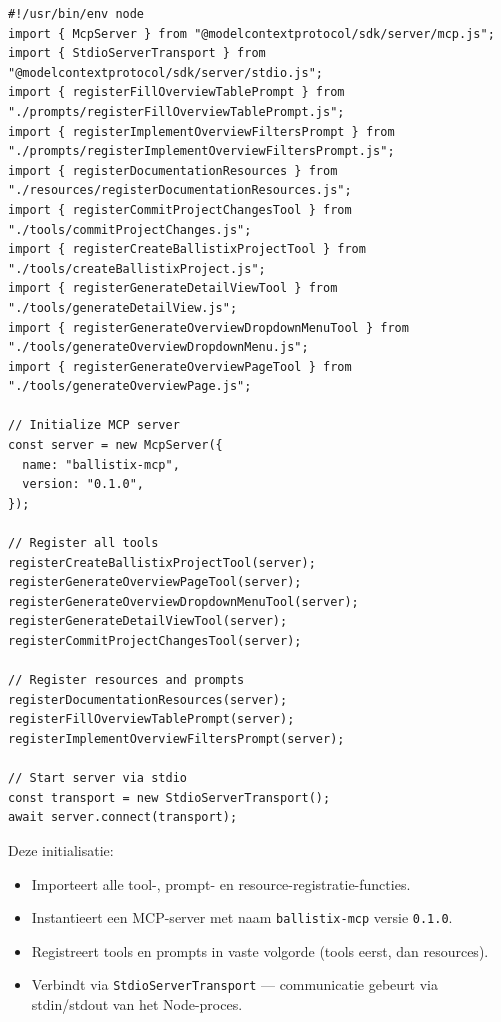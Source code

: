 \begin{verbatim}
#!/usr/bin/env node
import { McpServer } from "@modelcontextprotocol/sdk/server/mcp.js";
import { StdioServerTransport } from "@modelcontextprotocol/sdk/server/stdio.js";
import { registerFillOverviewTablePrompt } from "./prompts/registerFillOverviewTablePrompt.js";
import { registerImplementOverviewFiltersPrompt } from "./prompts/registerImplementOverviewFiltersPrompt.js";
import { registerDocumentationResources } from "./resources/registerDocumentationResources.js";
import { registerCommitProjectChangesTool } from "./tools/commitProjectChanges.js";
import { registerCreateBallistixProjectTool } from "./tools/createBallistixProject.js";
import { registerGenerateDetailViewTool } from "./tools/generateDetailView.js";
import { registerGenerateOverviewDropdownMenuTool } from "./tools/generateOverviewDropdownMenu.js";
import { registerGenerateOverviewPageTool } from "./tools/generateOverviewPage.js";

// Initialize MCP server
const server = new McpServer({
  name: "ballistix-mcp",
  version: "0.1.0",
});

// Register all tools
registerCreateBallistixProjectTool(server);
registerGenerateOverviewPageTool(server);
registerGenerateOverviewDropdownMenuTool(server);
registerGenerateDetailViewTool(server);
registerCommitProjectChangesTool(server);

// Register resources and prompts
registerDocumentationResources(server);
registerFillOverviewTablePrompt(server);
registerImplementOverviewFiltersPrompt(server);

// Start server via stdio
const transport = new StdioServerTransport();
await server.connect(transport);
\end{verbatim}

\noindent
Deze initialisatie:

\begin{itemize}
  \item Importeert alle tool-, prompt- en resource-registratie-functies.
  \item Instantieert een MCP-server met naam \texttt{ballistix-mcp} versie \texttt{0.1.0}.
  \item Registreert tools en prompts in vaste volgorde (tools eerst, dan resources).
  \item Verbindt via \texttt{StdioServerTransport} — communicatie gebeurt via stdin/stdout van het Node-proces.
\end{itemize}

